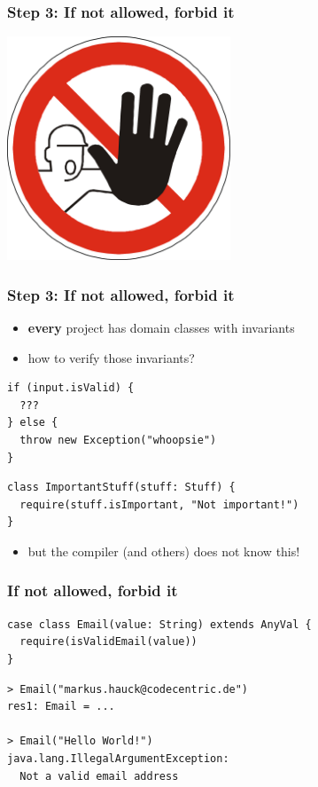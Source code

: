 \documentclass{beamer}
\begin{document}
\begin{frame}
  \frametitle{Step 3: If not allowed, forbid it}
  \begin{center}
    \includegraphics[width=0.5\textwidth]{../pics/forbidden.png}
  \end{center}
\end{frame}

\begin{frame}
  \frametitle{Step 3: If not allowed, forbid it}
  \begin{itemize}
  \item \textbf{every} project has domain classes with invariants
  \item how to verify those invariants?
  \end{itemize}
\begin{verbatim}
if (input.isValid) {
  ???
} else {
  throw new Exception("whoopsie")
}
\end{verbatim}
\begin{verbatim}
class ImportantStuff(stuff: Stuff) {
  require(stuff.isImportant, "Not important!")
}
\end{verbatim}
  \begin{itemize}
  \item but the compiler (and others) does not know this!
  \end{itemize}
\end{frame}

\begin{frame}[fragile]
  \frametitle{If not allowed, forbid it}
\begin{verbatim}
case class Email(value: String) extends AnyVal {
  require(isValidEmail(value))
}
\end{verbatim}
\begin{verbatim}
> Email("markus.hauck@codecentric.de")
res1: Email = ...

> Email("Hello World!")
java.lang.IllegalArgumentException: 
  Not a valid email address                      
\end{verbatim}
\end{frame}
\end{document}
